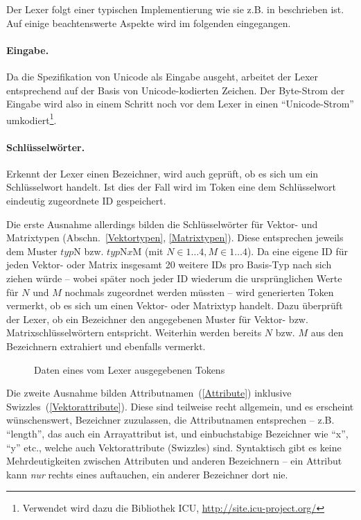 \documentclass[twoside,a4paper,fleqn,12pt]{article}
\begin{document}
Der Lexer folgt einer typischen Implementierung wie sie z.B. in \cite{wirth_compiler} beschrieben ist. Auf einige beachtenswerte Aspekte
wird im folgenden eingegangen.

\paragraph{Eingabe.} Da die Spezifikation von Unicode als Eingabe ausgeht, arbeitet der Lexer entsprechend auf der Basis von Unicode-kodierten Zeichen.
Der Byte-Strom der Eingabe wird also in einem Schritt noch vor dem Lexer in einen "`Unicode-Strom"' umkodiert\footnote{Verwendet wird dazu die Bibliothek ICU,
\url{http://site.icu-project.org/}}.

\paragraph{Schlüsselwörter.} Erkennt der Lexer einen Bezeichner, wird auch geprüft, ob es sich um ein Schlüsselwort handelt. Ist dies der Fall
wird im Token eine dem Schlüsselwort eindeutig zugeordnete ID gespeichert.

Die erste Ausnahme allerdings bilden die Schlüsselwörter für Vektor- und Matrixtypen (Abschn.~\ref{Vektortypen}, \ref{Matrixtypen}). Diese entsprechen
jeweils dem Muster $\mathit{typ}\mathrm{N}$ bzw. $\mathit{typ}\mathrm{N}\mathit{x}\mathrm{M}$ (mit $N \in 1 \dots 4, M \in 1 \dots 4$).
Da eine eigene ID für jeden Vektor- oder Matrix insgesamt 20 weitere IDs pro Basis-Typ nach sich ziehen würde -- wobei später noch jeder ID wiederum
die ursprünglichen Werte für $N$ und $M$ nochmals zugeordnet
werden müssten -- wird generierten Token vermerkt, ob es sich um einen Vektor- oder Matrixtyp handelt.
Dazu überprüft der Lexer, ob ein Bezeichner den angegebenen Muster für Vektor- bzw. Matrixschlüsselwörtern entspricht.
Weiterhin werden bereits $N$ bzw. $M$ aus den Bezeichnern extrahiert und ebenfalls vermerkt.

\begin{figure}[h]
   \centering
  
  \caption{Daten eines vom Lexer ausgegebenen Tokens}
  \label{fig:LexerToken}
\end{figure}

Die zweite Ausnahme bilden Attributnamen~(\ref{Attribute}) inklusive Swizzles~(\ref{Vektorattribute}). Diese sind teilweise recht allgemein, und
es erscheint wünschenswert, Bezeichner zuzulassen, die Attributnamen entsprechen -- z.B. ``length'', das auch ein Arrayattribut ist, und einbuchstabige
Bezeichner wie ``x'', ``y'' etc., welche auch Vektorattribute (Swizzles) sind. Syntaktisch gibt es keine Mehrdeutigkeiten zwischen Attributen und
anderen Bezeichnern -- ein Attribut kann \emph{nur} rechts eines  auftauchen, ein anderer Bezeichner dort nie.
\end{document}
